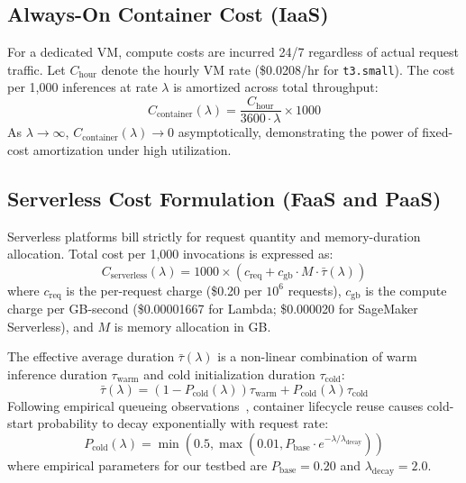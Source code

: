 \documentclass[conference]{IEEEtran}
\begin{document}
\subsection{Always-On Container Cost (IaaS)}
For a dedicated VM, compute costs are incurred 24/7 regardless of actual request traffic. Let $C_{\text{hour}}$ denote the hourly VM rate (\$0.0208/hr for \texttt{t3.small}). The cost per 1,000 inferences at rate $\lambda$ is amortized across total throughput:
\begin{equation}
    C_{\text{container}}(\lambda) = \frac{C_{\text{hour}}}{3600 \cdot \lambda} \times 1000
    \label{eq:container_cost}
\end{equation}
As $\lambda \to \infty$, $C_{\text{container}}(\lambda) \to 0$ asymptotically, demonstrating the power of fixed-cost amortization under high utilization.

\subsection{Serverless Cost Formulation (FaaS and PaaS)}
Serverless platforms bill strictly for request quantity and memory-duration allocation. Total cost per 1,000 invocations is expressed as:
\begin{equation}
    C_{\text{serverless}}(\lambda) = 1000 \times \left( c_{\text{req}} + c_{\text{gb}} \cdot M \cdot \bar{\tau}(\lambda) \right)
    \label{eq:serverless_cost}
\end{equation}
where $c_{\text{req}}$ is the per-request charge (\$0.20 per $10^6$ requests), $c_{\text{gb}}$ is the compute charge per GB-second (\$0.00001667 for Lambda; \$0.000020 for SageMaker Serverless), and $M$ is memory allocation in GB.

The effective average duration $\bar{\tau}(\lambda)$ is a non-linear combination of warm inference duration $\tau_{\text{warm}}$ and cold initialization duration $\tau_{\text{cold}}$:
\begin{equation}
    \bar{\tau}(\lambda) = (1 - P_{\text{cold}}(\lambda))\tau_{\text{warm}} + P_{\text{cold}}(\lambda)\tau_{\text{cold}}
\end{equation}
Following empirical queueing observations~\cite{shahrad2020serverless}, container lifecycle reuse causes cold-start probability to decay exponentially with request rate:
\begin{equation}
    P_{\text{cold}}(\lambda) = \min\left(0.5, \max\left(0.01, P_{\text{base}} \cdot e^{-\lambda / \lambda_{\text{decay}}}\right)\right)
\end{equation}
where empirical parameters for our testbed are $P_{\text{base}} = 0.20$ and $\lambda_{\text{decay}} = 2.0$.
\end{document}
